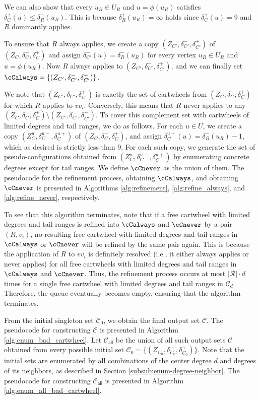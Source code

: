 \documentclass[10pt,a4paper]{article}
\begin{document}
We can also show that every 
$u_R\in U_R$ and $u=\phi(u_R)$ satisfies
$\delta_C^+(u) \leq \delta_R^+(u_R)$.
This is because $\delta_R^+(u_R)=\infty$ holds since $\delta_C^+(u)=9$ and $R$ dominantly applies.

To ensure that $R$ always applies, we create a copy $(Z_{C'}, \delta_{C'}^-, \delta_{C'}^+)$ of $(Z_C, \delta_C^-, \delta_C^+)$ and assign $\delta_{C'}^-(u)=\delta_R^-(u_R)$ for every vertex $u_R\in U_R$ and $u=\phi(u_R)$.
Now $R$ always applies to
$(Z_{C'}, \delta_{C'}^-, \delta_{C'}^+)$, and we can finally set
$\cCalways=\{(Z_{C'}, \delta_{C'}^-, \delta_{C'}^+)\}$.

We note that $(Z_{C'}, \delta_{C'}^-, \delta_{C'}^+)$ is exactly the set of cartwheels from
$(Z_C, \delta_C^-, \delta_C^+)$ for which $R$ applies to $vv_i$. Conversely, this means that $R$ never applies to any 
$(Z_C, \delta_C^-, \delta_C^+)\setminus (Z_{C'}, \delta_{C'}^-, \delta_{C'}^+)$. To cover this complement set with cartwheels of limited degrees and tail ranges, we do as follows.
For each $u \in U$, we create a copy $(Z_{C}^u, \delta_{C}^{u-}, \delta_{C}^{u+})$ of $(Z_C, \delta_C^-, \delta_C^+)$, and assign $\delta_{C}^{u+}(u)=\delta_R^-(u_R)-1$, which as desired is strictly less than 9.
For each such copy, we generate the set of pseudo-configurations obtained from $(Z_{C}^u, \delta_{C}^{u-}, \delta_{C}^{u+})$ by enumerating concrete degrees except for tail ranges.
We define $\cCnever$ as the union of them.
The pseudocode for the refinement process, obtaining $\cCalways$, and obtaining $\cCnever$ is presented in Algorithms \ref{alg:refinement}, \ref{alg:refine_always}, and \ref{alg:refine_never}, respectively.

To see that this algorithm terminates, note that if a free cartwheel with limited degrees and tail ranges is refined into $\cCalways$ and $\cCnever$ by a pair $(R, v_i)$, no resulting free cartwheel with limited degrees and tail ranges in $\cCalways$ or $\cCnever$ will be refined by the same pair again.
This is because the application of $R$ to $vv_i$ is definitely resolved (i.e., it either always applies or never applies) for all free cartwheels with limited degrees and tail ranges in $\cCalways$ and $\cCnever$.
Thus, the refinement process occurs at most $|\mathcal{R}| \cdot d$ times for a single free cartwheel with limited degrees and tail ranges in $\mathcal{C}_d$.
Therefore, the queue eventually becomes empty, ensuring that the algorithm terminates.

From the initial singleton set $\mathcal{C}_0$, we obtain the final output set $\mathcal{C}$.
The pseudocode for constructing $\mathcal{C}$ is presented in Algorithm \ref{alg:enum_bad_cartwheel}.
Let $\mathcal{C}_{\textsf{all}}$ be the union of all such output sets $\mathcal{C}$ obtained from every possible initial set $\mathcal{C}_0=\{(Z_{C_0}, \delta_{C_0}^-, \delta_{C_0}^+)\}$.
Note that the initial sets are enumerated by all combinations of the center degree $d$ and degrees of its neighbors, as described in Section \ref{subsub:enum-degree-neighbor}.
The pseudocode for constructing $\mathcal{C}_{\textsf{all}}$ is presented in Algorithm \ref{alg:enum_all_bad_cartwheel}.
\end{document}
